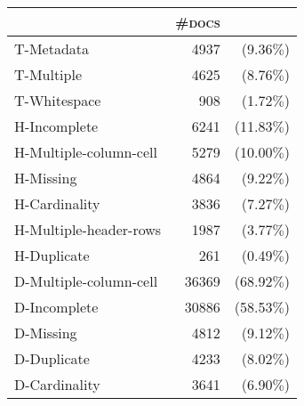 \begin{tabular}{lrr} 
 \toprule 
 & \textsc{\#docs} & \\ 
 \midrule 
T-Metadata&4937 &(9.36$\%$)\\ 
  T-Multiple&4625 &(8.76$\%$)\\ 
  T-Whitespace&908 &(1.72$\%$)\\ 
  \bottomrule 
H-Incomplete&6241 &(11.83$\%$)\\ 
  H-Multiple-column-cell&5279 &(10.00$\%$)\\ 
  H-Missing&4864 &(9.22$\%$)\\ 
  H-Cardinality&3836 &(7.27$\%$)\\ 
  H-Multiple-header-rows&1987 &(3.77$\%$)\\ 
  H-Duplicate&261 &(0.49$\%$)\\ 
  \bottomrule 
D-Multiple-column-cell&36369 &(68.92$\%$)\\ 
  D-Incomplete&30886 &(58.53$\%$)\\ 
  D-Missing&4812 &(9.12$\%$)\\ 
  D-Duplicate&4233 &(8.02$\%$)\\ 
  D-Cardinality&3641 &(6.90$\%$)\\ 
  \bottomrule 
 \end{tabular}